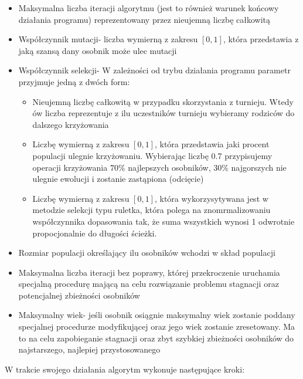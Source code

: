   \begin{itemize}
    \item Maksymalna liczba iteracji algorytmu (jest to również warunek końcowy działania programu) reprezentowany przez nieujemną liczbę całkowitą
    \item Współczynnik mutacji- liczba wymierną z zakresu $[0,1]$, która przedstawia z jaką szansą dany osobnik może ulec mutacji
    \item Współczynnik selekcji- W zależności od trybu działania programu parametr przyjmuje jedną z dwóch form:
    \begin{itemize}
      \item Nieujemną liczbę całkowitą w przypadku skorzystania z turnieju. Wtedy ów liczba reprezentuje z ilu uczestników turnieju wybieramy rodziców do dalszego krzyżowania
      \item Liczbę wymierną z zakresu $[0,1]$, która przedstawia jaki procent populacji ulegnie krzyżowaniu. Wybierając liczbę 0.7 przypisujemy operacji krzyżowania $70\%$ najlepszych osobników, $30\%$ najgorszych nie ulegnie ewolucji i zostanie zastąpiona (odcięcie)
      \item Liczbę wymierną z zakresu $[0,1]$, która wykorzysytywana jest w metodzie selekcji typu ruletka, która polega na znomrmalizowaniu współczynnika dopasowania tak, że suma wszystkich wynosi 1 odwrotnie propocjonalnie do długości ścieżki.
    \end{itemize}
    \item Rozmiar populacji określający ilu osobników wchodzi w skład populacji
    \item Maksymalna liczba iteracji bez poprawy, której przekroczenie uruchamia specjalną procedurę mającą na celu rozwiązanie problemu stagnacji oraz potencjalnej zbieżności osobników
    \item Maksymalny wiek- jeśli osobnik osiągnie maksymalny wiek zostanie poddany specjalnej procedurze modyfikującej oraz jego wiek zostanie zresetowany. Ma to na celu zapobieganie stagnacji oraz zbyt szybkiej zbieżności osobników do najstarszego, najlepiej przystosowanego
  \end{itemize}
  W trakcie swojego działania algorytm wykonuje następujące kroki:
